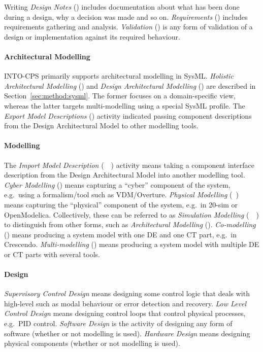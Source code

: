 Writing \emph{Design Notes} (\INTOCPS) includes documentation about what has been done during a design, why a decision was made and so on. \emph{Requirements} (\Modelio) includes requirements gathering and analysis. \emph{Validation} (\INTOCPS) is any form of validation of a design or implementation against its required behaviour.

\paragraph{Architectural Modelling}

INTO-CPS primarily supports architectural modelling in SysML. \emph{Holistic Architectural Modelling} (\Modelio) and \emph{Design Architectural Modelling} (\Modelio) are described in Section~\ref{sec:method:sysml}. The former focuses on a domain-specific view, whereas the latter targets multi-modelling using a special SysML profile. The \emph{Export Model Descriptions} (\Modelio) activity indicated passing component descriptions from the Design Architectural Model to other modelling tools.

\paragraph{Modelling}

The \emph{Import Model Description} (\Overture~\TwentySim~\OpenModelica) activity means taking a component interface description from the Design Architectural Model into another modelling tool. \emph{Cyber Modelling} (\Overture) means capturing a ``cyber'' component of the system, e.g.\ using a formalism/tool such as VDM/Overture. \emph{Physical Modelling} (\TwentySim~\OpenModelica) means capturing the ``physical'' component of the system, e.g.\ in 20-sim  or OpenModelica. Collectively, these can be referred to as \emph{Simulation Modelling} (\Overture~\TwentySim~\OpenModelica) to distinguish from other forms, such as \emph{Architectural Modelling} (\Modelio). \emph{Co-modelling} (\Crescendo) means producing a system model with one DE and one CT part, e.g.\ in Crescendo. \emph{Multi-modelling} (\INTOCPS) means producing a system model with multiple DE or CT parts with several tools.

\paragraph{Design}

\emph{Supervisory Control Design} means designing some control logic that deals with high-level such as modal behaviour or error detection and recovery. \emph{Low Level Control Design} means designing control loops that control physical processes, e.g.\ PID control. \emph{Software Design} is the activity of designing any form of software (whether or not modelling is used). \emph{Hardware Design} means designing physical components (whether or not modelling is used).

